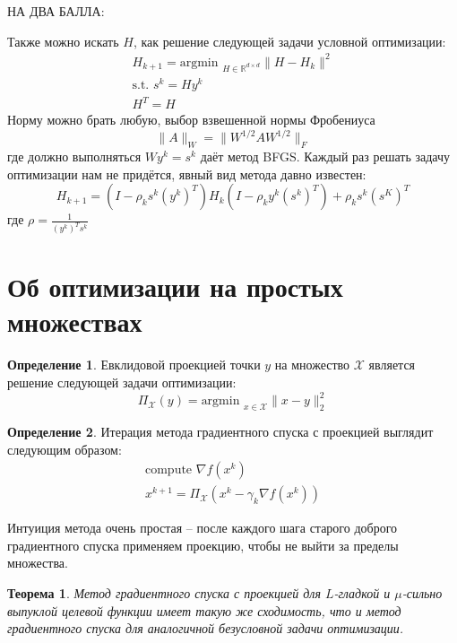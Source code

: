 \documentclass[a4paper,12pt]{article}
\theoremstyle{plain}
\newtheorem{theorem}{Теорема}[section]
\theoremstyle{definition}
\newtheorem{definition}{Определение}[section]
\theoremstyle{remark}
\begin{document}
НА ДВА БАЛЛА:

Также можно искать $H$, как решение следующей задачи условной оптимизации:
\begin{align*}
	H_{k  + 1} = \text{argmin }_{H \in \mathbb{R}^{d \times d}}\|H - H_k\|^2 \\
	\text{s.t. } s^k = Hy^k                                                  \\
	H^T = H
\end{align*}
Норму можно брать любую, выбор взвешенной нормы Фробениуса
\[
	\|A\|_W = \|W^{1/2}AW^{1/2}\|_F
\]
где должно выполняться $Wy^k = s^k$ даёт метод BFGS. Каждый раз решать задачу оптимизации нам не придётся, явный вид метода давно известен:
\[
	H_{k + 1} = (I - \rho_ks^k(y^k)^T)H_k(I - \rho_ky^k(s^k)^T) + \rho_ks^k(s^K)^T
\]
где $\rho = \frac{1}{(y^k)^Ts^k}$

\section{Об оптимизации на простых множествах}
\begin{definition}
	Евклидовой проекцией точки $y$ на множество $\mathcal{X}$ является решение следующей задачи оптимизации:
	\[
		\Pi_\mathcal{X}(y) = \text{argmin }_{x \in \mathcal{X}}\|x - y\|_2^2
	\]
\end{definition}

\begin{definition}
	Итерация метода градиентного спуска с проекцией выглядит следующим образом:
	\begin{align*}
		\text{compute }\nabla f(x^k) \\
		x^{k + 1} = \Pi_\mathcal{X}(x^k - \gamma_k\nabla f(x^k))
	\end{align*}
\end{definition}

Интуиция метода очень простая -- после каждого шага старого доброго градиентного спуска применяем проекцию, чтобы не выйти за пределы множества.

\begin{theorem}
	Метод градиентного спуска с проекцией для $L$-гладкой и $\mu$-сильно выпуклой целевой функции имеет такую же сходимость, что и метод градиентного спуска для аналогичной безусловной задачи оптимизации.
\end{theorem}
\end{document}

